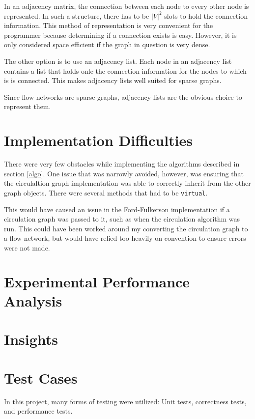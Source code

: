 \documentclass[conference]{IEEEtran}
\begin{document}
In an adjacency matrix, the connection between each node to every other node is represented.
In such a structure, there has to be $|V|^2$ slots to hold the connection information. This
method of representation is very convenient for the programmer because determining if a 
connection exists is easy. However, it is only considered space efficient if the graph in
question is very dense. 

The other option is to use an adjacency list. Each node in an adjacency list contains a list 
that holds onle the connection information for the nodes to which is is connected. This makes 
adjacency lists well suited for sparse graphs. 

Since flow networks are sparse graphs, adjacency lists are the obvious choice to represent them.

\section{Implementation Difficulties} %
There were very few obstacles while implementing the algorithms described in section 
\ref{algo}. One issue that was narrowly avoided, however, was ensuring that the circulaltion
graph implementation was able to correctly inherit from the other graph objects. There
were several methods that had to be \lstinline{virtual}. 

This would have caused an issue in the Ford-Fulkerson implementation if a circulation graph
was passed to it, such as when the circulation algorithm was run. This could have been 
worked around my converting the circulation graph to a flow network, but would have relied
too heavily on convention to ensure errors were not made.


\section{Experimental Performance Analysis}

\section{Insights}

\section{Test Cases} %
In this project, many forms of testing were utilized: Unit tests, correctness tests,
and performance tests.
\end{document}
